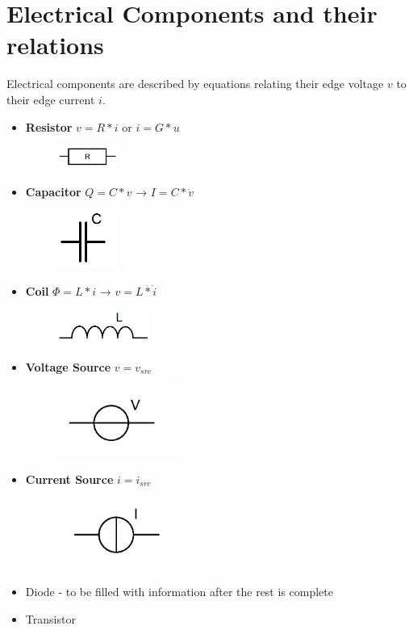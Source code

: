 \section{Electrical Components and their relations}
Electrical components are described by equations relating their edge voltage $v$ to their edge current $i$.
\begin{itemize}
	\item \textbf{Resistor} \newline
	$v = R*i$ or $i = G*u$
	\begin{figure}[H]
		\centering
		\includegraphics[width=2cm]{pictures/resistor.png}
	\end{figure}
	\item \textbf{Capacitor} \newline
	$Q = C * v$ → $I = C*\dot{v}$
	\begin{figure}[H]
		\centering
		\includegraphics[width=2cm]{pictures/capacitor.png}
	\end{figure}
	\item \textbf{Coil} \newline
	$\Phi = L*i$ → $v = L*\dot{i}$
	\begin{figure}[H]
		\centering
		\includegraphics[width=3cm]{pictures/coil.png}
	\end{figure}
	\item \textbf{Voltage Source} \newline
	$v = v_{src}$
	\begin{figure}[H]
		\centering
		\includegraphics[width=4cm]{pictures/voltage_source.png}
	\end{figure}
	\item \textbf{Current Source} \newline
	$i = i_{src}$
	\begin{figure}[H]
		\centering
		\includegraphics[width=4cm]{pictures/current_source.png}
	\end{figure}
	\item Diode - to be filled with information after the rest is complete
	\item Transistor
\end{itemize}

